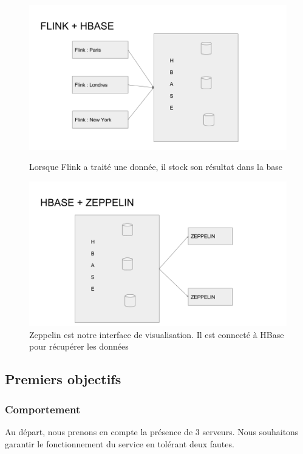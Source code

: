 \documentclass[a4paper,oneside,10pt]{article}
\begin{document}
\pagebreak

\begin{figure}[h]
\centering
\includegraphics[width=16cm]{content/FlinkHbase.png}
\caption{Lorsque Flink a traité une donnée, il stock son résultat dans la base}
\label{fig1}
\centering
\includegraphics[width=16cm]{content/HbaseZeppelin.png}
\caption{Zeppelin est notre interface de visualisation. Il est connecté à HBase pour récupérer les données}
\label{fig1}
\end{figure}

\pagebreak

\subsection{Premiers objectifs}

\subsubsection{Comportement}

Au départ, nous prenons en compte la présence de 3 serveurs. 
Nous souhaitons garantir le fonctionnement du service en tolérant deux fautes. 
\end{document}
